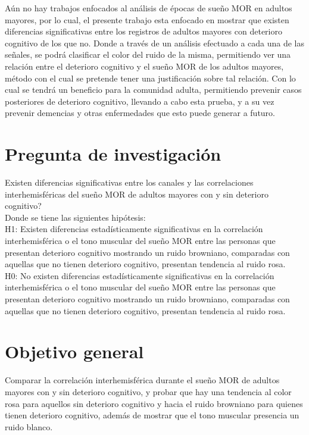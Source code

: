 \documentclass[letterpaper,titlepage,12pt,draft]{report}
\begin{document}
A\'un no hay trabajos enfocados al an\'alisis de \'epocas de sue\~no MOR en adultos mayores, por lo cual, el presente trabajo esta enfocado en mostrar que existen diferencias significativas entre los registros de adultos mayores con deterioro cognitivo de los que no. Donde a trav\'es de un an\'alisis efectuado a cada una de las se\~nales, se podr\'a clasificar el color del ruido de la misma, permitiendo ver una relaci\'on entre el deterioro cognitivo y el sue\~no MOR de los adultos mayores, m\'etodo con el cual se pretende tener una justificaci\'on sobre tal relaci\'on. Con lo cual se tendr\'a un beneficio para la comunidad adulta, permitiendo prevenir casos posteriores de deterioro cognitivo, llevando a cabo esta prueba, y a su vez prevenir demencias y otras enfermedades que esto puede generar a futuro. 

\section{Pregunta de investigaci\'on}

Existen diferencias significativas entre los canales y las correlaciones interhemisf\'ericas del sue\~no MOR de adultos mayores con y sin deterioro cognitivo?\\

Donde se tiene las siguientes hip\'otesis:\\

H1: Existen diferencias estad\'isticamente significativas en la correlaci\'on interhemisf\'erica o el tono muscular del sue\~no MOR entre las personas que presentan deterioro cognitivo mostrando un ruido browniano, comparadas con aquellas que no tienen deterioro cognitivo, presentan tendencia al ruido rosa.\\

H0: No existen diferencias estad\'isticamente significativas en la correlaci\'on interhemisf\'erica o el tono muscular del sue\~no MOR entre las personas que presentan deterioro cognitivo mostrando un ruido browniano, comparadas con aquellas que no tienen deterioro cognitivo, presentan tendencia al ruido rosa.


\section{Objetivo general}
Comparar la correlaci\'on interhemisf\'erica durante el sue\~no MOR de adultos mayores con y sin deterioro cognitivo, y probar que hay una tendencia al color rosa para aquellos sin deterioro cognitivo y hacia el ruido browniano para quienes tienen deterioro cognitivo, adem\'as de mostrar que el tono muscular presencia un ruido blanco.
\end{document}

